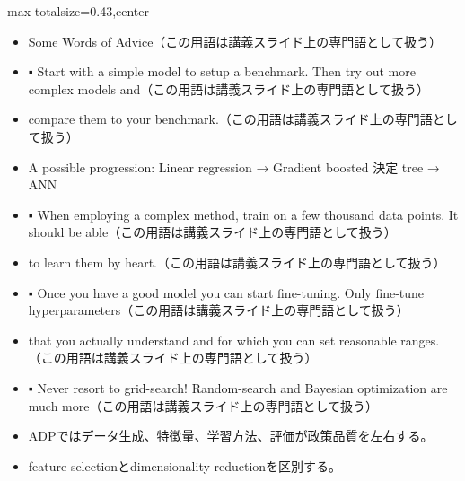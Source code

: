 \clearpage
{}
\begin{minipage}[t]{0.405\textwidth}
\begin{adjustbox}{max totalsize={\textwidth}{0.43\textheight},center}
\begin{minipage}{\textwidth}\scriptsize
{}\begin{itemize}
\item Some Words of Advice（この用語は講義スライド上の専門語として扱う）
\item ▪ Start with a simple model to setup a benchmark. Then try out more complex models and（この用語は講義スライド上の専門語として扱う）
\item compare them to your benchmark.（この用語は講義スライド上の専門語として扱う）
\item A possible progression: Linear regression → Gradient boosted 決定 tree → ANN
\item ▪ When employing a complex method, train on a few thousand data points. It should be able（この用語は講義スライド上の専門語として扱う）
\item to learn them by heart.（この用語は講義スライド上の専門語として扱う）
\item ▪ Once you have a good model you can start fine-tuning. Only fine-tune hyperparameters（この用語は講義スライド上の専門語として扱う）
\item that you actually understand and for which you can set reasonable ranges.（この用語は講義スライド上の専門語として扱う）
\item ▪ Never resort to grid-search! Random-search and Bayesian optimization are much more（この用語は講義スライド上の専門語として扱う）
\end{itemize}\begin{itemize}
\item ADPではデータ生成、特徴量、学習方法、評価が政策品質を左右する。
\item feature selectionとdimensionality reductionを区別する。
\end{itemize}
\end{minipage}
\end{adjustbox}
\end{minipage}\hfill
